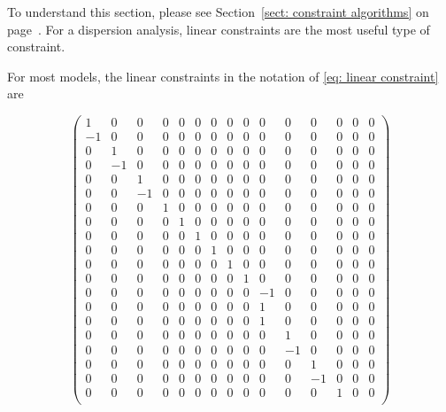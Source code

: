 To understand this section, please see Section~\ref{sect: constraint algorithms} on page~\pageref{sect: constraint algorithms}.
For a dispersion analysis, linear constraints are the most useful type of constraint.

For most models, the linear constraints in the notation of \eqref{eq: linear constraint} are
\begin{small}
\begin{equation}
    \begin{pmatrix}
        1 & 0 & 0 & 0 & 0 & 0 & 0 & 0 & 0 & 0 & 0 & 0 & 0 & 0 & 0 \\
       -1 & 0 & 0 & 0 & 0 & 0 & 0 & 0 & 0 & 0 & 0 & 0 & 0 & 0 & 0 \\
        0 & 1 & 0 & 0 & 0 & 0 & 0 & 0 & 0 & 0 & 0 & 0 & 0 & 0 & 0 \\
        0 &-1 & 0 & 0 & 0 & 0 & 0 & 0 & 0 & 0 & 0 & 0 & 0 & 0 & 0 \\
        0 & 0 & 1 & 0 & 0 & 0 & 0 & 0 & 0 & 0 & 0 & 0 & 0 & 0 & 0 \\
        0 & 0 &-1 & 0 & 0 & 0 & 0 & 0 & 0 & 0 & 0 & 0 & 0 & 0 & 0 \\
        0 & 0 & 0 & 1 & 0 & 0 & 0 & 0 & 0 & 0 & 0 & 0 & 0 & 0 & 0 \\
        0 & 0 & 0 & 0 & 1 & 0 & 0 & 0 & 0 & 0 & 0 & 0 & 0 & 0 & 0 \\
        0 & 0 & 0 & 0 & 0 & 1 & 0 & 0 & 0 & 0 & 0 & 0 & 0 & 0 & 0 \\
        0 & 0 & 0 & 0 & 0 & 0 & 1 & 0 & 0 & 0 & 0 & 0 & 0 & 0 & 0 \\
        0 & 0 & 0 & 0 & 0 & 0 & 0 & 1 & 0 & 0 & 0 & 0 & 0 & 0 & 0 \\
        0 & 0 & 0 & 0 & 0 & 0 & 0 & 0 & 1 & 0 & 0 & 0 & 0 & 0 & 0 \\
        0 & 0 & 0 & 0 & 0 & 0 & 0 & 0 & 0 &-1 & 0 & 0 & 0 & 0 & 0 \\
        0 & 0 & 0 & 0 & 0 & 0 & 0 & 0 & 0 & 1 & 0 & 0 & 0 & 0 & 0 \\
        0 & 0 & 0 & 0 & 0 & 0 & 0 & 0 & 0 & 1 & 0 & 0 & 0 & 0 & 0 \\
        0 & 0 & 0 & 0 & 0 & 0 & 0 & 0 & 0 & 0 & 1 & 0 & 0 & 0 & 0 \\
        0 & 0 & 0 & 0 & 0 & 0 & 0 & 0 & 0 & 0 &-1 & 0 & 0 & 0 & 0 \\
        0 & 0 & 0 & 0 & 0 & 0 & 0 & 0 & 0 & 0 & 0 & 1 & 0 & 0 & 0 \\
        0 & 0 & 0 & 0 & 0 & 0 & 0 & 0 & 0 & 0 & 0 &-1 & 0 & 0 & 0 \\
        0 & 0 & 0 & 0 & 0 & 0 & 0 & 0 & 0 & 0 & 0 & 0 & 1 & 0 & 0 \\

\end{pmatrix}
\end{equation}
\end{small}
